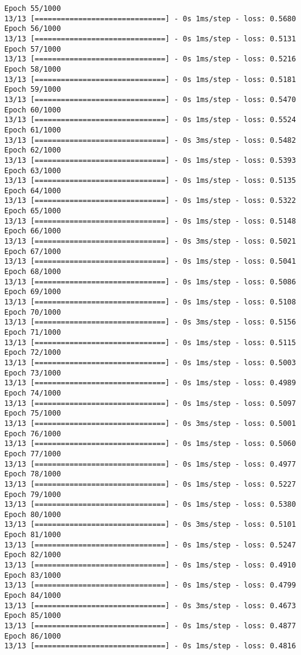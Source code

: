 \documentclass[11pt]{article}
\begin{document}
\begin{Verbatim}[commandchars=\\\{\}]
Epoch 55/1000
13/13 [==============================] - 0s 1ms/step - loss: 0.5680
Epoch 56/1000
13/13 [==============================] - 0s 1ms/step - loss: 0.5131
Epoch 57/1000
13/13 [==============================] - 0s 1ms/step - loss: 0.5216
Epoch 58/1000
13/13 [==============================] - 0s 1ms/step - loss: 0.5181
Epoch 59/1000
13/13 [==============================] - 0s 1ms/step - loss: 0.5470
Epoch 60/1000
13/13 [==============================] - 0s 1ms/step - loss: 0.5524
Epoch 61/1000
13/13 [==============================] - 0s 3ms/step - loss: 0.5482
Epoch 62/1000
13/13 [==============================] - 0s 1ms/step - loss: 0.5393
Epoch 63/1000
13/13 [==============================] - 0s 1ms/step - loss: 0.5135
Epoch 64/1000
13/13 [==============================] - 0s 1ms/step - loss: 0.5322
Epoch 65/1000
13/13 [==============================] - 0s 1ms/step - loss: 0.5148
Epoch 66/1000
13/13 [==============================] - 0s 3ms/step - loss: 0.5021
Epoch 67/1000
13/13 [==============================] - 0s 1ms/step - loss: 0.5041
Epoch 68/1000
13/13 [==============================] - 0s 1ms/step - loss: 0.5086
Epoch 69/1000
13/13 [==============================] - 0s 1ms/step - loss: 0.5108
Epoch 70/1000
13/13 [==============================] - 0s 3ms/step - loss: 0.5156
Epoch 71/1000
13/13 [==============================] - 0s 1ms/step - loss: 0.5115
Epoch 72/1000
13/13 [==============================] - 0s 1ms/step - loss: 0.5003
Epoch 73/1000
13/13 [==============================] - 0s 1ms/step - loss: 0.4989
Epoch 74/1000
13/13 [==============================] - 0s 1ms/step - loss: 0.5097
Epoch 75/1000
13/13 [==============================] - 0s 3ms/step - loss: 0.5001
Epoch 76/1000
13/13 [==============================] - 0s 1ms/step - loss: 0.5060
Epoch 77/1000
13/13 [==============================] - 0s 1ms/step - loss: 0.4977
Epoch 78/1000
13/13 [==============================] - 0s 1ms/step - loss: 0.5227
Epoch 79/1000
13/13 [==============================] - 0s 1ms/step - loss: 0.5380
Epoch 80/1000
13/13 [==============================] - 0s 3ms/step - loss: 0.5101
Epoch 81/1000
13/13 [==============================] - 0s 1ms/step - loss: 0.5247
Epoch 82/1000
13/13 [==============================] - 0s 1ms/step - loss: 0.4910
Epoch 83/1000
13/13 [==============================] - 0s 1ms/step - loss: 0.4799
Epoch 84/1000
13/13 [==============================] - 0s 3ms/step - loss: 0.4673
Epoch 85/1000
13/13 [==============================] - 0s 1ms/step - loss: 0.4877
Epoch 86/1000
13/13 [==============================] - 0s 1ms/step - loss: 0.4816

\end{Verbatim}
\end{document}
